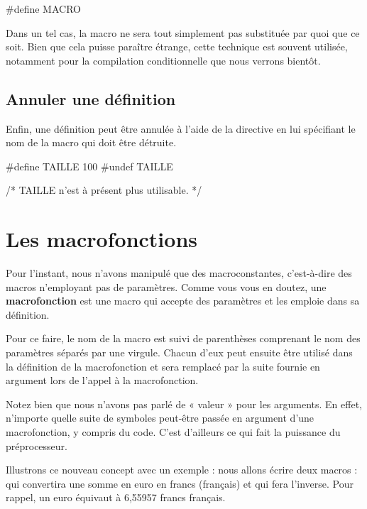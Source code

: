 \begin{C}
#define MACRO
\end{C}

Dans un tel cas, la macro ne sera tout simplement pas substituée par
quoi que ce soit. Bien que cela puisse paraître étrange, cette technique
est souvent utilisée, notamment pour la compilation conditionnelle que
nous verrons bientôt.

\subsection{Annuler une définition}
\label{annuler-une-definition}

Enfin, une définition peut être annulée à l'aide de la directive
 en lui spécifiant le nom de la macro qui doit être
détruite.

\begin{C}
#define TAILLE 100
#undef TAILLE

/* TAILLE n'est à présent plus utilisable. */
\end{C}

\section{Les macrofonctions}
\label{les-macrofonctions}

Pour l'instant, nous n'avons manipulé que des macroconstantes,
c'est-à-dire des macros n'employant pas de paramètres. Comme vous vous
en doutez, une \textbf{macrofonction} est une macro qui accepte des
paramètres et les emploie dans sa définition.

\begin{C}

\end{C}

Pour ce faire, le nom de la macro est suivi de parenthèses comprenant le
nom des paramètres séparés par une virgule. Chacun d'eux peut ensuite
être utilisé dans la définition de la macrofonction et sera remplacé par
la suite fournie en argument lors de l'appel à la macrofonction.

\begin{erreurbox} 
 Notez bien que nous n'avons pas parlé de «
valeur » pour les arguments. En effet, n'importe quelle suite de
symboles peut-être passée en argument d'une macrofonction, y compris du
code. C'est d'ailleurs ce qui fait la puissance du préprocesseur.
\end{erreurbox}


Illustrons ce nouveau concept avec un exemple : nous allons écrire deux
macros :  qui convertira une somme en euro en francs
(français) et  qui fera l'inverse. Pour rappel, un euro
équivaut à 6,55957 francs français.

